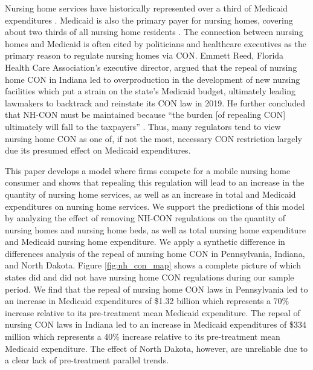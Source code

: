 \documentclass[../Main.tex]{subfiles}
\begin{document}
Nursing home services have historically represented over a third of Medicaid expenditures \citep{wiener1999controlling}. Medicaid is also the primary payer for nursing homes, covering about two thirds of all nursing home residents . The connection between nursing homes and Medicaid is often cited by politicians and healthcare executives as the primary reason to regulate nursing homes via CON. Emmett Reed, Florida Health Care Association’s executive director, argued that the repeal of nursing home CON in Indiana led to overproduction in the development of new nursing facilities which put a strain on the state’s Medicaid budget, ultimately leading lawmakers to backtrack and reinstate its CON law in 2019. He further concluded that NH-CON must be maintained because “the burden [of repealing CON] ultimately will fall to the taxpayers” \citep{sexton2019conrepeal}. Thus, many regulators tend to view nursing home CON as one of, if not the most, necessary CON restriction largely due its presumed effect on Medicaid expenditures.

This paper develops a model where firms compete for a mobile nursing home consumer and shows that repealing this regulation will lead to an increase in the quantity of nursing home services, as well as an increase in total and Medicaid expenditures on nursing home services. We support the predictions of this model by analyzing the effect of removing NH-CON regulations on the quantity of nursing homes and nursing home beds, as well as total nursing home expenditure and Medicaid nursing home expenditure. We apply a synthetic difference in differences analysis of the repeal of nursing home CON in Pennsylvania, Indiana, and North Dakota. Figure \ref{fig:nh_con_map} shows a complete picture of which states did and did not have nursing home CON regulations during our sample period. We find that the repeal of nursing home CON laws in Pennsylvania led to an increase in Medicaid expenditures of \$1.32 billion which represents a 70\% increase relative to its pre-treatment mean Medicaid expenditure. The repeal of nursing CON laws in Indiana led to an increase in Medicaid expenditures of \$334 million  which represents a 40\% increase relative to its pre-treatment mean Medicaid expenditure. The effect of North Dakota, however, are unreliable due to a clear lack of pre-treatment parallel trends. 
\end{document}
